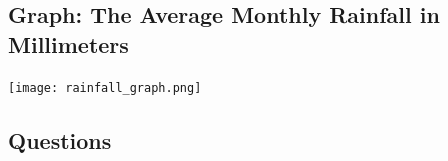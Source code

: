 \documentclass[12pt]{article}
\begin{document}
\vspace{1cm}

\subsection*{Graph: The Average Monthly Rainfall in Millimeters}

\begin{center}
\texttt{[image: rainfall\_graph.png]} %
\end{center}

\vspace{1cm}

\subsection*{Questions}
\end{document}
